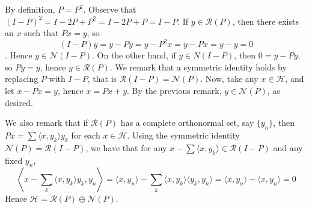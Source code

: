 \documentclass{homework}
\begin{document}

\begin{solution}
  By definition, $P=P^2$.  Observe that $(I-P)^2 = I - 2P + P^2 = I - 2P + P = I-P$.  If $y \in \mathcal R(P)$, then there exists an $x$ such that $Px = y$, so 
  $$(I - P)y = y - Py = y - P^2 x = y - P x = y - y = 0$$.
  Hence $y \in \mathcal N(I-P)$.  On the other hand, if $y \in N(I-P)$, then $0
  = y - Py$, so $Py = y$, hence $y \in \mathcal R(P)$. We remark that a
  symmetric identity holds by replacing $P$ with $I-P$, that is $\mathcal
  R(I-P) = \mathcal N(P)$.  Now, take any $x \in \mathcal H$, and let $x - Px =
  y$, hence $x = Px + y$.  By the previous remark, $y\in \mathcal N(P)$, as
  desired.

  We also remark that if $\mathcal R(P)$ has a complete orthonormal set, say
  $\{y_n\}$, then $P x = \sum \langle x, y_k\rangle y_k$ for each $x \in
  \mathcal H$.  Using the symmetric identity $\mathcal N(P) = \mathcal R(I-P)$,
  we have that for any $x - \sum \langle x,y_k\rangle \in \mathcal R(I-P)$ and any fixed $y_n$,    
  $$
    \left \langle  x - \sum_k \langle x,y_k\rangle y_k,y_n\right\rangle 
    = \langle x, y_n\rangle - \sum_k \langle x,y_k\rangle\langle  y_k, y_n \rangle  = \langle x, y_n\rangle - \langle x, y_n\rangle = 0
  $$
  Hence $\mathcal H = \mathcal R(P) \oplus \mathcal N(P)$.
\end{solution}
\end{document}
